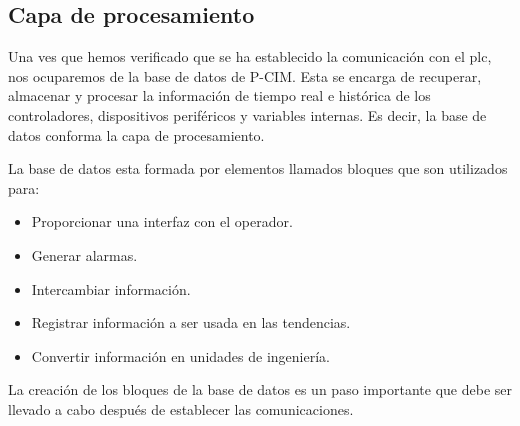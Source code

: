 \subsection{Capa de procesamiento}
\label{subsec:CapaProcesamiento}
Una ves que hemos verificado que se ha establecido la comunicación con el 
\gls{plc}, nos ocuparemos de la base de datos de P-CIM. Esta se encarga de 
recuperar, almacenar y procesar la información de tiempo real e histórica de los 
controladores, dispositivos periféricos y variables internas. Es decir, la base 
de datos conforma la capa de procesamiento.

La base de datos esta formada por elementos llamados bloques que son utilizados 
para:
\begin{itemize}
 \item Proporcionar una interfaz con el operador.
 \item Generar alarmas.
 \item Intercambiar información.
 \item Registrar información a ser usada en las tendencias.
 \item Convertir información en unidades de ingeniería.
\end{itemize}
La creación de los bloques de la base de datos es un paso importante que 
debe ser llevado a cabo después de establecer las comunicaciones.

